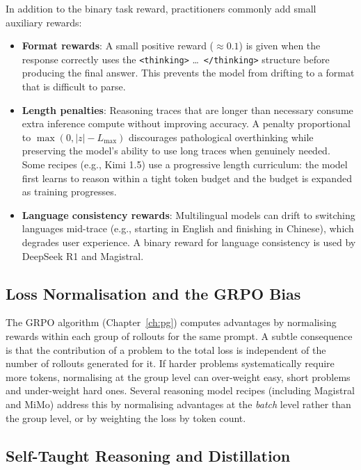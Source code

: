 In addition to the binary task reward, practitioners commonly add
small auxiliary rewards:

\begin{itemize}[leftmargin=*]
\item \textbf{Format rewards}: A small positive reward ($\approx 0.1$)
  is given when the response correctly uses the \texttt{<thinking>}
  \ldots\ \texttt{</thinking>} structure before producing the final
  answer. This prevents the model from drifting to a format that is
  difficult to parse.

\item \textbf{Length penalties}: Reasoning traces that are longer than
  necessary consume extra inference compute without improving accuracy.
  A penalty proportional to $\max(0, |z| - L_{\max})$ discourages
  pathological overthinking while preserving the
  model's ability to use long traces when genuinely needed. Some
  recipes (e.g., Kimi 1.5) use a progressive length curriculum:
  the model first learns to reason within a tight token budget and
  the budget is expanded as training progresses.

\item \textbf{Language consistency rewards}: Multilingual models can
  drift to switching languages mid-trace (e.g., starting in English
  and finishing in Chinese), which degrades user experience. A binary
  reward for language consistency is used by DeepSeek R1 and Magistral.
\end{itemize}

\subsection{Loss Normalisation and the GRPO Bias}
\label{subsec:loss-norm}

The GRPO algorithm (Chapter~\ref{ch:pg}) computes advantages by
normalising rewards within each group of rollouts for the same
prompt. A subtle consequence is that the contribution of a problem
to the total loss is independent of the number of rollouts generated
for it. If harder problems systematically require more tokens,
normalising at the group level can over-weight easy, short problems
and under-weight hard ones. Several reasoning model recipes
(including Magistral and MiMo) address this by normalising advantages
at the \emph{batch} level rather than the group level, or by
weighting the loss by token count.

\subsection{Self-Taught Reasoning and Distillation}
\label{subsec:star-distill}

